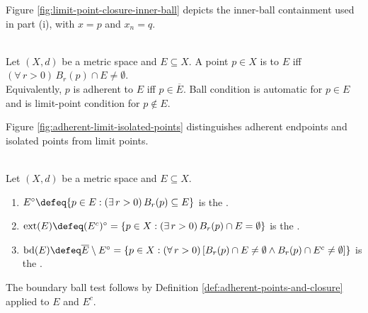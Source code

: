 \begin{illustrationfigure}[H]
  \centering
  
  \caption{If $d=d(x,x_n)<r$ and $0<\rho<r-d$, then $B_\rho(x_n)\subseteq B_r(x)$.}
  \label{fig:limit-point-closure-inner-ball}
\end{illustrationfigure}
Figure \ref{fig:limit-point-closure-inner-ball} depicts the inner-ball containment used in part (i), with $x=p$ and $x_n=q$.

\begin{definition} \label{def:adherent-points-and-closure} \\
Let $(X,d)$ be a metric space and $E\subseteq X$. A point $p\in X$ is  to $E$ iff $(\forall\,r>0)\,B_r(p)\cap E\neq\emptyset$.\\
Equivalently, $p$ is adherent to $E$ iff $p\in\overline{E}$. Ball condition is automatic for $p\in E$ and is limit-point condition for $p\notin E$.
\end{definition}

\begin{illustrationfigure}[H]
  \centering
  
  \caption{Adherent endpoints need not lie in $E$; isolated points are adherent but not limit points.}
  \label{fig:adherent-limit-isolated-points}
\end{illustrationfigure}
Figure \ref{fig:adherent-limit-isolated-points} distinguishes adherent endpoints and isolated points from limit points.

\begin{definition} \label{def:interior-closure-boundary} \\
Let $(X,d)$ be a metric space and $E\subseteq X$.
\begin{enumerate}[label=(\roman*)]
\setlength{\itemsep}{0pt}
\item $E^\circ\defeq\{p\in E:(\exists\,r>0)\,B_r(p)\subseteq E\}$ is the .
\item $\operatorname{ext}(E)\defeq(E^c)^\circ=\{p\in X:(\exists\,r>0)\,B_r(p)\cap E=\emptyset\}$ is the .
\item $\operatorname{bd}(E)\defeq\overline{E}\setminus E^\circ=\{p\in X:(\forall\,r>0)\,[B_r(p)\cap E\neq\emptyset\land B_r(p)\cap E^c\neq\emptyset]\}$ is the .
\end{enumerate}
The boundary ball test follows by Definition \ref{def:adherent-points-and-closure} applied to $E$ and $E^c$.
\end{definition}

